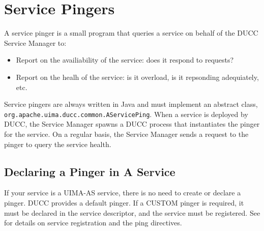       \section{Service Pingers}
      \label{sec:service.pingers}
      A service pinger is a small program that queries a service on behalf of the
      DUCC Service Manager to:
      \begin{itemize}
        \item Report on the availiability of the service: does it respond to requests?
        \item Report on the healh of the service: is it overload, is it repsonding
          adequiately, etc.
      \end{itemize}
      
      Service pingers are always written in Java and must implement an abstract class,
      {\tt org.apache.uima.ducc.common.AServicePing}.   When a service is deployed by
      DUCC, the Service Manager spawns a DUCC process that instantiates the pinger for
      the service.  On a regular basis, the Service Manager sends a request to the pinger
      to query the service health.

      \subsection{Declaring a Pinger in A Service}

      If your service is a UIMA-AS service, there is no need to create or declare a pinger.  DUCC
      provides a default pinger.  If a CUSTOM pinger is required, it must be declared in the service
      descriptor, and the service must be registered.  See  for
      details on service registration and the ping directives.      


